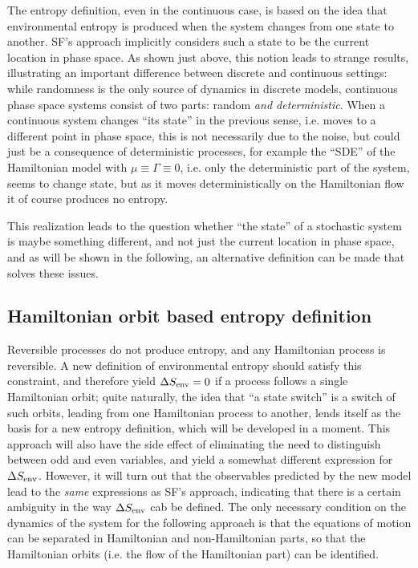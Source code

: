 The entropy definition, even in the continuous case, is based on the idea that environmental entropy is produced when the system changes from one state to another. SF's approach implicitly considers such a state to be the current location in phase space. As shown just above, this notion leads to strange results, illustrating an important difference between discrete and continuous settings: while randomness is the only source of dynamics in discrete models, continuous phase space systems consist of two parts: random \emph{and deterministic}.
When a continuous system changes ``its state'' in the previous sense, i.e. moves to a different point in phase space, this is not necessarily due to the noise, but could just be a consequence of deterministic processes, for example the ``SDE'' of the Hamiltonian model  with \(\mu \equiv \Gamma \equiv 0\), i.e. only the deterministic part of the system, seems to change state, but as it moves deterministically on the Hamiltonian flow it of course produces no entropy.

This realization leads to the question whether ``the state'' of a stochastic system is maybe something different, and not just the current location in phase space, and as will be shown in the following, an alternative definition can be made that solves these issues.

\subsection{Hamiltonian orbit based entropy definition}
\label{sec:flow entropy}

Reversible processes do not produce entropy, and any Hamiltonian process is reversible. A new definition of environmental entropy should satisfy this constraint, and therefore yield \(\Delta S_\text{env} = 0\) if a process follows a single Hamiltonian orbit; quite naturally, the idea that ``a state switch'' is a switch of such orbits, leading from one Hamiltonian process to another, lends itself as the basis for a new entropy definition, which will be developed in a moment. This approach will also have the side effect of eliminating the need to distinguish between odd and even variables, and yield a somewhat different expression for \(\Delta S_\text{env}\). However, it will turn out that the observables predicted by the new model lead to the \emph{same} expressions as SF's approach, indicating that there is a certain ambiguity in the way \(\Delta S_\text{env}\) cab be defined. The only necessary condition on the dynamics of the system for the following approach is that the equations of motion can be separated in Hamiltonian and non-Hamiltonian parts, so that the Hamiltonian orbits (i.e. the flow of the Hamiltonian part) can be identified.

